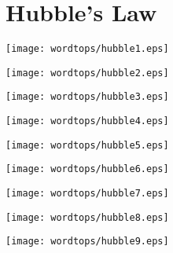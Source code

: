 \chapter{Hubble's Law}

\texttt{[image: wordtops/hubble1.eps]}

\texttt{[image: wordtops/hubble2.eps]}

\texttt{[image: wordtops/hubble3.eps]}

\texttt{[image: wordtops/hubble4.eps]}

\texttt{[image: wordtops/hubble5.eps]}

\texttt{[image: wordtops/hubble6.eps]}

\texttt{[image: wordtops/hubble7.eps]}

\texttt{[image: wordtops/hubble8.eps]}

\texttt{[image: wordtops/hubble9.eps]}
